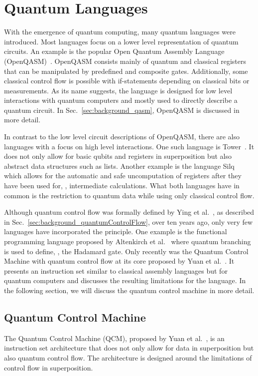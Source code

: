 \section{Quantum Languages}
\label{sec:background_quantumLanguages}
With the emergence of quantum computing, many quantum languages were introduced. Most languages focus on a lower level representation of quantum circuits. An example is the popular Open Quantum Assembly Language (OpenQASM)~\cite{CBSG17}. OpenQASM consists mainly of quantum and classical registers that can be manipulated by predefined and composite gates. Additionally, some classical control flow is possible with if-statements depending on classical bits or measurements. As its name suggests, the language is designed for low level interactions with quantum computers and mostly used to directly describe a quantum circuit. In Sec.~\ref{sec:background_qasm}, OpenQASM is discussed in more detail. 

In contrast to the low level circuit descriptions of OpenQASM, there are also languages with a focus on high level interactions. One such language is Tower~\cite{YuCa22}. It does not only allow for basic qubits and registers in superposition but also abstract data structures such as lists. Another example is the language Silq~\cite{BBGV20} which allows for the automatic and safe uncomputation of registers after they have been used for, \eg, intermediate calculations. What both languages have in common is the restriction to quantum data while using only classical control flow. 

Although quantum control flow was formally defined by Ying et al.~\cite{YYF12}, as described in Sec.~\ref{sec:background_quantumControlFlow}, over ten years ago, only very few languages have incorporated the principle. One example is the functional programming language proposed by Altenkirch et al.~\cite{AlGr05} where quantum branching is used to define, \eg, the Hadamard gate. Only recently was the Quantum Control Machine with quantum control flow at its core proposed by Yuan et al.~\cite{YVC24}. It presents an instruction set similar to classical assembly languages but for quantum computers and discusses the resulting limitations for the language. In the following section, we will discuss the quantum control machine in more detail.

\subsection{Quantum Control Machine}
\label{sec:background_quantumControlMachine}
The Quantum Control Machine (QCM), proposed by Yuan et al.~\cite{YVC24}, is an instruction set architecture that does not only allow for data in superposition but also quantum control flow. The architecture is designed around the limitations of control flow in superposition. 

